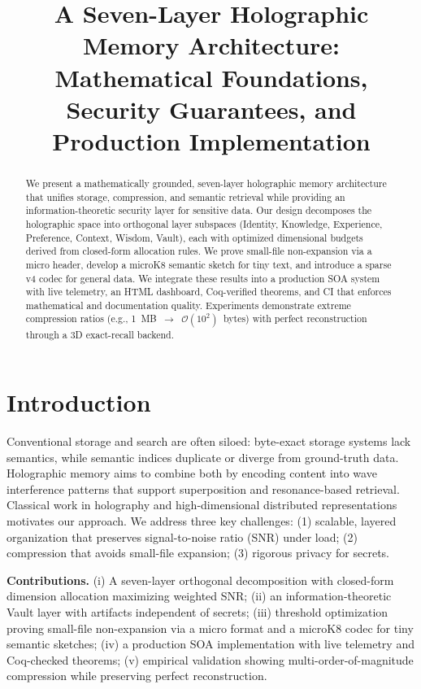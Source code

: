 \documentclass[conference]{IEEEtran}
\title{A Seven-Layer Holographic Memory Architecture: Mathematical Foundations, Security Guarantees, and Production Implementation}
\author{\IEEEauthorblockN{TAI Research Team}\IEEEauthorblockA{HolographicMemory and TAI Projects}}
\begin{document}
\maketitle

\begin{abstract}
We present a mathematically grounded, seven-layer holographic memory architecture that unifies storage, compression, and semantic retrieval while providing an information-theoretic security layer for sensitive data. Our design decomposes the holographic space into orthogonal layer subspaces (Identity, Knowledge, Experience, Preference, Context, Wisdom, Vault), each with optimized dimensional budgets derived from closed-form allocation rules. We prove small-file non-expansion via a micro header, develop a microK8 semantic sketch for tiny text, and introduce a sparse v4 codec for general data. We integrate these results into a production SOA system with live telemetry, an HTML dashboard, Coq-verified theorems, and CI that enforces mathematical and documentation quality. Experiments demonstrate extreme compression ratios (e.g., 1~MB~$\rightarrow$~$\mathcal{O}(10^2)$~bytes) with perfect reconstruction through a 3D exact-recall backend.\end{abstract}

\section{Introduction}
Conventional storage and search are often siloed: byte-exact storage systems lack semantics, while semantic indices duplicate or diverge from ground-truth data. Holographic memory aims to combine both by encoding content into wave interference patterns that support superposition and resonance-based retrieval. Classical work in holography \cite{gabor1948,goodman2017,born1999} and high-dimensional distributed representations \cite{plate1995,kanerva2009} motivates our approach. We address three key challenges: (1) scalable, layered organization that preserves signal-to-noise ratio (SNR) under load; (2) compression that avoids small-file expansion; (3) rigorous privacy for secrets.

\textbf{Contributions.} (i) A seven-layer orthogonal decomposition with closed-form dimension allocation maximizing weighted SNR; (ii) an information-theoretic Vault layer with artifacts independent of secrets; (iii) threshold optimization proving small-file non-expansion via a micro format and a microK8 codec for tiny semantic sketches; (iv) a production SOA implementation with live telemetry and Coq-checked theorems; (v) empirical validation showing multi-order-of-magnitude compression while preserving perfect reconstruction.
\end{document}
